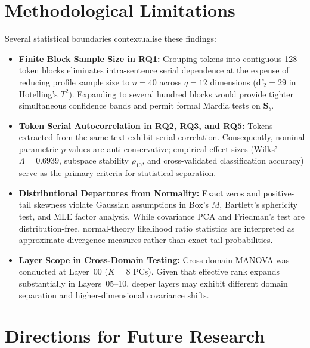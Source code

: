 \documentclass[12pt, a4paper, oneside]{report}
\theoremstyle{definition}
\newcommand{\vect}[1]{\mathbf{#1}}
\begin{document}
\section{Methodological Limitations}

Several statistical boundaries contextualise these findings:
\begin{itemize}
    \item \textbf{Finite Block Sample Size in RQ1:} Grouping tokens into contiguous 128-token blocks eliminates intra-sentence serial dependence at the expense of reducing profile sample size to $n = 40$ across $q = 12$ dimensions ($\mathrm{df}_2 = 29$ in Hotelling's $T^2$). Expanding to several hundred blocks would provide tighter simultaneous confidence bands and permit formal Mardia tests on $\vect{S}_b$.
    \item \textbf{Token Serial Autocorrelation in RQ2, RQ3, and RQ5:} Tokens extracted from the same text exhibit serial correlation. Consequently, nominal parametric $p$-values are anti-conservative; empirical effect sizes (Wilks' $\Lambda = 0.6939$, subspace stability $\bar{\rho}_{10}$, and cross-validated classification accuracy) serve as the primary criteria for statistical separation.
    \item \textbf{Distributional Departures from Normality:} Exact zeros and positive-tail skewness violate Gaussian assumptions in Box's $M$, Bartlett's sphericity test, and MLE factor analysis. While covariance PCA and Friedman's test are distribution-free, normal-theory likelihood ratio statistics are interpreted as approximate divergence measures rather than exact tail probabilities.
    \item \textbf{Layer Scope in Cross-Domain Testing:} Cross-domain MANOVA was conducted at Layer~00 ($K = 8$ PCs). Given that effective rank expands substantially in Layers~05--10, deeper layers may exhibit different domain separation and higher-dimensional covariance shifts.
\end{itemize}

\section{Directions for Future Research}
\end{document}
